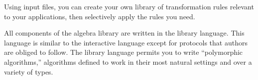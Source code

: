 %

Using input files, you can create your own library of
transformation rules relevant to your applications, then
selectively apply the rules you need.


All components of the \Language{} algebra library are written in
the \Language{} library language.
This language is similar to the interactive language
except for protocols that authors are obliged to follow.
The library language permits you to write ``polymorphic
algorithms,'' algorithms defined to work in
their most natural settings and over a variety of types.

